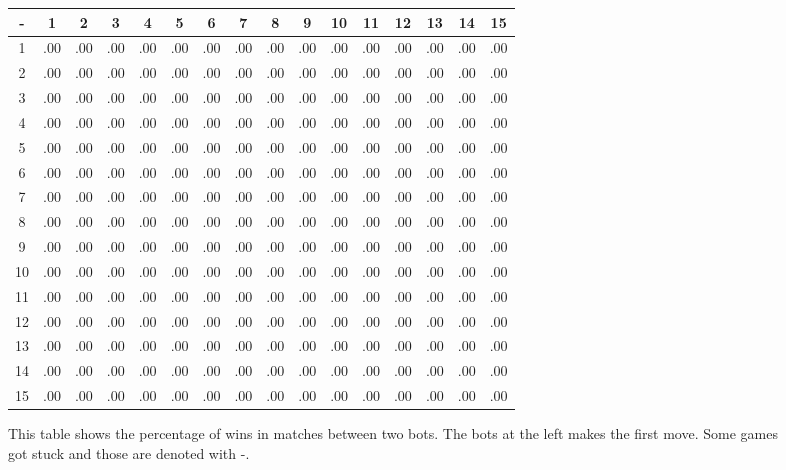 \begin{figure}
{\tiny
\begin{tabular}{ | c | c c c c c c c c c c c c c c c | }
\hline
 -  & 1 & 2 & 3 & 4 & 5 & 6 & 7 & 8 & 9 & 10 & 11 & 12 & 13 & 14 & 15 \\ \hline
1  & .00 & .00 & .00 & .00 & .00 & .00 & .00 & .00 & .00 & .00  & .00  & .00  & .00  & .00  & .00  \\
2  & .00 & .00 & .00 & .00 & .00 & .00 & .00 & .00 & .00 & .00  & .00  & .00  & .00  & .00  & .00  \\
3  & .00 & .00 & .00 & .00 & .00 & .00 & .00 & .00 & .00 & .00  & .00  & .00  & .00  & .00  & .00  \\
4  & .00 & .00 & .00 & .00 & .00 & .00 & .00 & .00 & .00 & .00  & .00  & .00  & .00  & .00  & .00  \\
5  & .00 & .00 & .00 & .00 & .00 & .00 & .00 & .00 & .00 & .00  & .00  & .00  & .00  & .00  & .00  \\
6  & .00 & .00 & .00 & .00 & .00 & .00 & .00 & .00 & .00 & .00  & .00  & .00  & .00  & .00  & .00  \\
7  & .00 & .00 & .00 & .00 & .00 & .00 & .00 & .00 & .00 & .00  & .00  & .00  & .00  & .00  & .00  \\
8  & .00 & .00 & .00 & .00 & .00 & .00 & .00 & .00 & .00 & .00  & .00  & .00  & .00  & .00  & .00  \\
9  & .00 & .00 & .00 & .00 & .00 & .00 & .00 & .00 & .00 & .00  & .00  & .00  & .00  & .00  & .00  \\
10 & .00 & .00 & .00 & .00 & .00 & .00 & .00 & .00 & .00 & .00  & .00  & .00  & .00  & .00  & .00  \\
11 & .00 & .00 & .00 & .00 & .00 & .00 & .00 & .00 & .00 & .00  & .00  & .00  & .00  & .00  & .00  \\
12 & .00 & .00 & .00 & .00 & .00 & .00 & .00 & .00 & .00 & .00  & .00  & .00  & .00  & .00  & .00  \\
13 & .00 & .00 & .00 & .00 & .00 & .00 & .00 & .00 & .00 & .00  & .00  & .00  & .00  & .00  & .00  \\
14 & .00 & .00 & .00 & .00 & .00 & .00 & .00 & .00 & .00 & .00  & .00  & .00  & .00  & .00  & .00  \\
15 & .00 & .00 & .00 & .00 & .00 & .00 & .00 & .00 & .00 & .00  & .00  & .00  & .00  & .00  & .00  \\ \hline
\end{tabular}}
\caption{This table shows the percentage of wins in matches between two bots.
The bots at the left makes the first move. Some games got stuck and those are denoted with -.}
\label{stats}
\end{figure}




